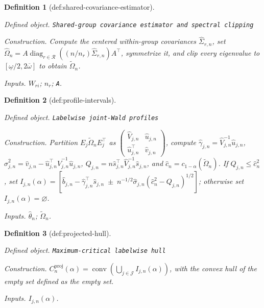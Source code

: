 \documentclass{article}
\newtheorem{definition}{Definition}
\begin{document}
\begin{definition}[def:shared-covariance-estimator]\label{def:shared-covariance-estimator}
\par\smallskip\noindent\emph{Defined object.} \texttt{Shared-\allowbreak{}group covariance estimator and spectral clipping}
\par\smallskip\noindent\emph{Construction.} Compute the centered within-group covariances \(\widehat\Sigma_{r,n}\), set \(\widehat\Omega_n=A\operatorname{diag}_{r\in\mathcal R}((n/n_r)\widehat\Sigma_{r,n})A^{\top}\), symmetrize it, and clip every eigenvalue to \([\underline\omega/2,2\overline\omega]\) to obtain \(\widetilde\Omega_n\).
\par\smallskip\noindent\emph{Inputs.} \(W_{ri}\); \(n_r\); \texttt{A}.
\end{definition}

\begin{definition}[def:profile-intervals]\label{def:profile-intervals}
\par\smallskip\noindent\emph{Defined object.} \texttt{Labelwise joint-\allowbreak{}Wald profiles}
\par\smallskip\noindent\emph{Construction.} Partition \(E_j\widetilde\Omega_nE_j^{\top}\) as \(\begin{pmatrix}\widehat V_{j,n}&\widehat u_{j,n}\\\widehat u_{j,n}^{\top}&\widehat v_{j,n}\end{pmatrix}\), compute \(\widehat\gamma_{j,n}=\widehat V_{j,n}^{-1}\widehat u_{j,n}\), \(\widehat\sigma_{j,n}^2=\widehat v_{j,n}-\widehat u_{j,n}^{\top}\widehat V_{j,n}^{-1}\widehat u_{j,n}\), \(Q_{j,n}=n\widehat s_{j,n}^{\top}\widehat V_{j,n}^{-1}\widehat s_{j,n}\), and \(\widehat c_n=c_{1-\alpha}(\widetilde\Omega_n)\). If \(Q_{j,n}\le\widehat c_n^2\), set \(I_{j,n}(\alpha)=[\widehat b_{j,n}-\widehat\gamma_{j,n}^{\top}\widehat s_{j,n}\;\pm\;n^{-1/2}\widehat\sigma_{j,n}(\widehat c_n^2-Q_{j,n})^{1/2}]\); otherwise set \(I_{j,n}(\alpha)=\varnothing\).
\par\smallskip\noindent\emph{Inputs.} \(\widehat\theta_n\); \(\widetilde\Omega_n\).
\end{definition}

\begin{definition}[def:projected-hull]\label{def:projected-hull}
\par\smallskip\noindent\emph{Defined object.} \texttt{Maximum-\allowbreak{}critical labelwise hull}
\par\smallskip\noindent\emph{Construction.} \(C_n^{\mathrm{proj}}(\alpha)=\operatorname{conv}(\bigcup_{j\in\mathcal J}I_{j,n}(\alpha))\), with the convex hull of the empty set defined as the empty set.
\par\smallskip\noindent\emph{Inputs.} \(I_{j,n}(\alpha)\).
\end{definition}
\end{document}
